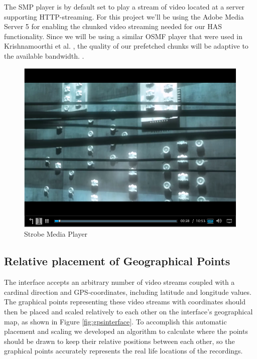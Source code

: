 \documentclass[9pt,a4paper]{acmproc}
\begin{document}
The SMP player is by default set to play a stream of video located at a server supporting HTTP-streaming. For this project we'll be using the Adobe Media Server 5 for enabling the chunked video streaming needed for our HAS functionality. Since we will be using a similar OSMF player that were used in Krishnamoorthi et al. \cite{hasmultipath}, the quality of our prefetched chunks will be adaptive to the available bandwidth. \cite{hasmultipath}.

\begin{figure}[t!]
\begin{center}
	\includegraphics[scale=0.5]{Media_player.png}
	\caption{Strobe Media Player}
	\label{fig:mediaplayer}
\end{center}
\end{figure}

\subsection{Relative placement of Geographical Points}
The interface accepts an arbitrary number of video streams coupled with a cardinal direction and GPS-coordinates, including latitude and longitude values. The graphical points representing these video streams with coordinates should then be placed and scaled relatively to each other on the interface's geographical map, as shown in Figure \ref{fig:gpsinterface}. To accomplish this automatic placement and scaling we developed an algorithm to calculate where the points should be drawn to keep their relative positions between each other, so the graphical points accurately represents the real life locations of the recordings.
\end{document}
